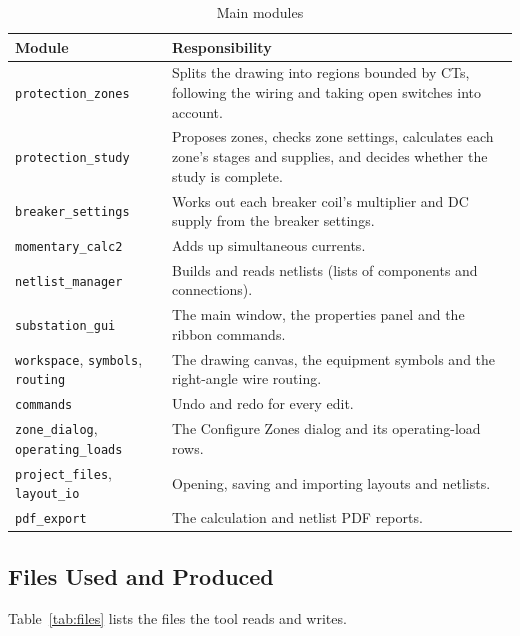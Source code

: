 \begin{table}[H]
  \centering
  \caption{Main modules}
  \label{tab:modules}
  \begin{tabularx}{\textwidth}{l L}
    \toprule
    \textbf{Module} & \textbf{Responsibility} \\
    \midrule
    \texttt{protection\_zones} & Splits the drawing into regions bounded by CTs, following the wiring and taking open switches into account. \\
    \texttt{protection\_study} & Proposes zones, checks zone settings, calculates each zone's stages and supplies, and decides whether the study is complete. \\
    \texttt{breaker\_settings} & Works out each breaker coil's multiplier and DC supply from the breaker settings. \\
    \texttt{momentary\_calc2} & Adds up simultaneous currents. \\
    \texttt{netlist\_manager} & Builds and reads netlists (lists of components and connections). \\
    \texttt{substation\_gui} & The main window, the properties panel and the ribbon commands. \\
    \texttt{workspace}, \texttt{symbols}, \texttt{routing} & The drawing canvas, the equipment symbols and the right-angle wire routing. \\
    \texttt{commands} & Undo and redo for every edit. \\
    \texttt{zone\_dialog}, \texttt{operating\_loads} & The Configure Zones dialog and its operating-load rows. \\
    \texttt{project\_files}, \texttt{layout\_io} & Opening, saving and importing layouts and netlists. \\
    \texttt{pdf\_export} & The calculation and netlist PDF reports. \\
    \bottomrule
  \end{tabularx}
\end{table}

\subsection{Files Used and Produced}

Table~\ref{tab:files} lists the files the tool reads and writes.

